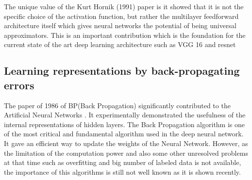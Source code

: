 \documentclass[a4paper,12pt]{article}
\begin{document}
The unique value of the Kurt Hornik (1991) \cite{hornik1991} paper is it showed that it is not the specific choice of the activation function, but rather the multilayer feedforward architecture itself which gives neural networks the potential of being universal approximators. This is an important contribution which is the foundation for the current state of the art deep learning architecture such as VGG 16  \cite{SimonyanZ14a} and resnet \cite{DBLP:journals/corr/HeZRS15}




\subsection{Learning representations by back-propagating errors\cite{Rumelhart1986}}
The paper of 1986  of BP(Back Propagation) significantly contributed  to the Artificial Neural Networks \cite{Rumelhart1986}. It experimentally demonstrated the  usefulness of the internal representations of hidden layers. The Back Propagation algorithm is one of the most critical and fundamental algorithm used in the deep neural network. It gave an efficient way to update the weights of the Neural Network. However, as the limitation of the computation power and also some other unresolved problems at that time such as overfitting and big number of labeled data is not available, the importance of this algorithms is still not well known as it is shown recently.\\

               


  
 
\end{document}
